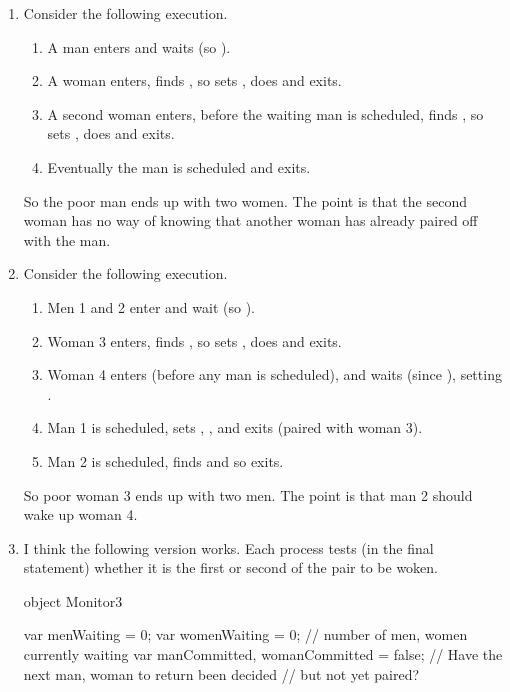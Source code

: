 
\begin{answer}
\begin{enumerate}
\item
Consider the following execution.
%
\begin{enumerate}
\item A man enters and waits (so ).

\item
A woman enters, finds , so sets , does  and exits.

\item
A second woman enters, before the waiting man is scheduled, finds
, so sets , does
 and exits.

\item
Eventually the man is scheduled and exits.
\end{enumerate}
%
So the poor man ends up with two women.  The point is that the second woman
has no way of knowing that another woman has already paired off with the man. 


\item
Consider the following execution.
%
\begin{enumerate}
\item
Men 1 and 2 enter and wait (so ).

\item
Woman 3 enters, finds , so sets , does  and exits.

\item
Woman 4 enters (before any man is scheduled), and waits (since
), setting .

\item
Man 1 is scheduled, sets , , and exits (paired with woman 3).

\item
Man 2 is scheduled, finds  and so exits.
\end{enumerate}
%
So poor woman 3 ends up with two men.  The point is that man 2 should wake up
woman 4. 


\item
I think the following version works.  Each process tests (in the final
 statement) whether it is the first or second of the pair to be
woken. 
%
\begin{scala}
object Monitor3{
  var menWaiting = 0; var womenWaiting = 0; 
    // number of men, women currently waiting
  var manCommitted, womanCommitted = false;
    // Have the next man, woman to return been decided 
    // but not yet paired?

}
\end{scala}
\end{enumerate}
\end{answer}
